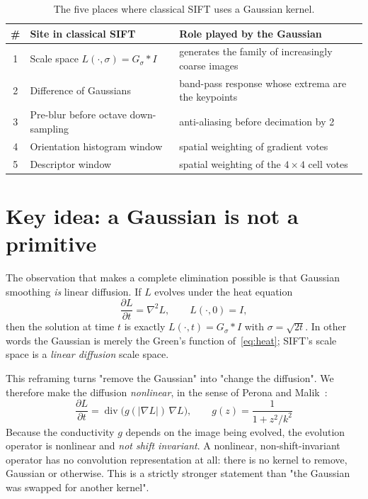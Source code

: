 \documentclass[11pt,a4paper]{article}
\begin{document}
\begin{table}[ht]
\centering
\small
\begin{tabular}{@{}clp{8.2cm}@{}}
\toprule
\# & Site in classical SIFT & Role played by the Gaussian \\
\midrule
1 & Scale space $L(\cdot,\sigma)=G_\sigma * I$ & generates the family of
    increasingly coarse images \\
2 & Difference of Gaussians & band-pass response whose extrema are the keypoints \\
3 & Pre-blur before octave down-sampling & anti-aliasing before decimation by 2 \\
4 & Orientation histogram window & spatial weighting of gradient votes \\
5 & Descriptor window & spatial weighting of the $4\times4$ cell votes \\
\bottomrule
\end{tabular}
\caption{The five places where classical SIFT uses a Gaussian kernel.}
\label{tab:where}
\end{table}

\section{Key idea: a Gaussian is not a primitive}

The observation that makes a complete elimination possible is that Gaussian
smoothing \emph{is} linear diffusion. If $L$ evolves under the heat equation
\begin{equation}
\frac{\partial L}{\partial t}=\nabla^{2}L ,
\qquad L(\cdot,0)=I ,
\label{eq:heat}
\end{equation}
then the solution at time $t$ is exactly $L(\cdot,t)=G_{\sigma}*I$ with
$\sigma=\sqrt{2t}$. In other words the Gaussian is merely the Green's function
of~\eqref{eq:heat}; SIFT's scale space is a \emph{linear diffusion} scale space.

This reframing turns "remove the Gaussian" into "change the diffusion". We
therefore make the diffusion \emph{nonlinear}, in the sense of Perona and
Malik~\cite{perona1990}:
\begin{equation}
\boxed{\;
\frac{\partial L}{\partial t}
=\operatorname{div}\!\bigl(g(|\nabla L|)\,\nabla L\bigr),
\qquad
g(z)=\frac{1}{1+z^{2}/k^{2}} \; }
\label{eq:pm}
\end{equation}
Because the conductivity $g$ depends on the image being evolved, the evolution
operator is nonlinear and \emph{not shift invariant}. A nonlinear,
non-shift-invariant operator has no convolution representation at all: there is
no kernel to remove, Gaussian or otherwise. This is a strictly stronger
statement than "the Gaussian was swapped for another kernel".
\end{document}

